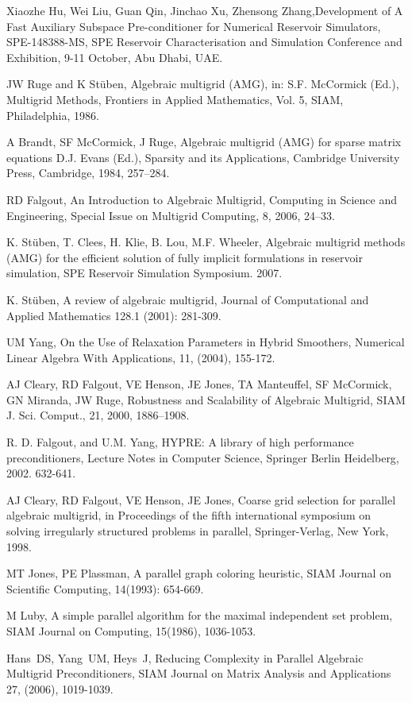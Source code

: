 \documentclass[12pt]{book}
\begin{document}
\begin{thebibliography}{00}

    Xiaozhe Hu, Wei Liu, Guan Qin, Jinchao Xu, Zhensong Zhang,Development of A Fast Auxiliary Subspace
    Pre-conditioner for Numerical Reservoir Simulators, SPE-148388-MS, SPE Reservoir Characterisation and
    Simulation Conference and Exhibition, 9-11 October, Abu Dhabi, UAE.

    {JW Ruge and K St\"{u}ben}, {Algebraic multigrid (AMG)},
    in: S.F. McCormick (Ed.), Multigrid Methods, Frontiers in Applied Mathematics, Vol. 5, SIAM, Philadelphia, 1986.

    {A Brandt, SF McCormick, J Ruge},
    Algebraic multigrid (AMG) for sparse matrix equations
    D.J. Evans (Ed.), Sparsity and its Applications, Cambridge University Press, Cambridge, 1984, 257--284.

    RD Falgout, An Introduction to Algebraic Multigrid, Computing in Science and Engineering,
    Special Issue on Multigrid Computing, 8, 2006, 24--33.

    K. St\"{u}ben, T. Clees, H. Klie, B. Lou, M.F. Wheeler,
    Algebraic multigrid methods (AMG) for the efficient solution of fully implicit formulations in reservoir simulation,
    SPE Reservoir Simulation Symposium. 2007.

    K. St\"{u}ben,
    A review of algebraic multigrid,
    Journal of Computational and Applied Mathematics 128.1 (2001): 281-309.

    UM Yang, On the Use of Relaxation Parameters in Hybrid Smoothers,
    Numerical Linear Algebra With Applications, 11, (2004), 155-172.

    {AJ Cleary, RD Falgout, VE Henson, JE Jones, TA Manteuffel, SF McCormick,
    GN Miranda, JW Ruge}, {Robustness and Scalability of Algebraic Multigrid}, SIAM J. Sci. Comput., 21, 2000, 1886--1908.

    R. D. Falgout, and U.M. Yang, HYPRE: A library of high performance preconditioners,
    Lecture Notes in Computer Science, Springer Berlin Heidelberg, 2002. 632-641.

    AJ Cleary, RD Falgout, VE Henson, JE Jones, Coarse grid selection for parallel algebraic multigrid, in Proceedings of the
    fifth international symposium on solving irregularly structured problems in parallel, Springer-Verlag, New York, 1998.

    MT Jones, PE Plassman, A parallel graph coloring heuristic, SIAM Journal on Scientific Computing, 14(1993): 654-669.

    M Luby, A simple parallel algorithm for the maximal independent set problem,
    SIAM Journal on Computing, 15(1986), 1036-1053.

    Hans~DS, Yang~UM, Heys~J,
    Reducing Complexity in Parallel Algebraic Multigrid Preconditioners,
    SIAM Journal on Matrix Analysis and Applications 27, (2006), 1019-1039.

\end{thebibliography}
\end{document}
